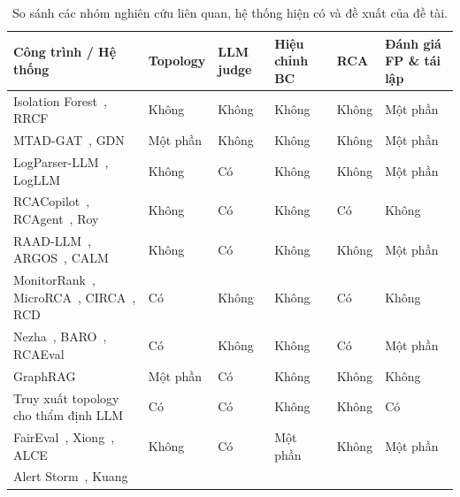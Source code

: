 \begin{table}[htbp]
  \centering
  \caption[So sánh công trình liên quan, hệ thống hiện có và đề xuất]{So sánh các nhóm nghiên cứu liên quan, hệ thống hiện có và đề xuất của đề tài.}
  \label{tab:ch3-so-sanh}
  \footnotesize
  \renewcommand{\arraystretch}{1.15}
  \setlength{\tabcolsep}{3.5pt}
  \begin{tabularx}{\linewidth}{@{}Y >{\centering\arraybackslash}p{1.45cm} >{\centering\arraybackslash}p{1.45cm} >{\centering\arraybackslash}p{1.6cm} >{\centering\arraybackslash}p{1.2cm} >{\centering\arraybackslash}p{1.65cm}@{}}
    \toprule
    \textbf{Công trình / Hệ thống} &
    \textbf{Topology} &
    \textbf{LLM judge} &
    \textbf{Hiệu chỉnh BC} &
    \textbf{RCA} &
    \textbf{Đánh giá FP \& tái lập} \\
    \midrule
    Isolation Forest~\cite{liu2008iforest}, RRCF~\cite{guha2016rrcf} &
      Không & Không & Không & Không & Một phần \\
    MTAD-GAT~\cite{zhao2020mtadgat}, GDN~\cite{deng2021gdn} &
      Một phần & Không & Không & Không & Một phần \\
    LogParser-LLM~\cite{zhong2024logparser}, LogLLM~\cite{guan2024logllm} &
      Không & Có & Không & Không & Một phần \\
    RCACopilot~\cite{chen2024rcacopilot}, RCAgent~\cite{wang2024rcagent}, Roy~\cite{roy2024exploring} &
      Không & Có & Không & Có & Không \\
    RAAD-LLM~\cite{russellgilbert2025raad}, ARGOS~\cite{gu2025argos}, CALM~\cite{devireddy2025calm} &
      Không & Có & Không & Không & Một phần \\
    MonitorRank~\cite{kim2013monitorrank}, MicroRCA~\cite{wu2020microrca}, CIRCA~\cite{li2022circa}, RCD~\cite{ikram2022rcd} &
      Có & Không & Không & Có & Không \\
    Nezha~\cite{yu2023nezha}, BARO~\cite{pham2024baro}, RCAEval~\cite{pham2025rcaeval} &
      Có & Không & Không & Có & Một phần \\
    GraphRAG~\cite{edge2024graphrag} &
      Một phần & Có & Không & Không & Không \\
    Truy xuất topology cho thẩm định LLM~\cite{author2026icaetm} &
      Có & Có & Không & Không & Có \\
    FairEval~\cite{wang2024fair}, Xiong~\cite{xiong2024uncertainty}, ALCE~\cite{gao2023alce} &
      Không & Có & Một phần & Không & Một phần \\
    Alert Storm~\cite{zhao2020alertstorm}, Kuang~\cite{kuang2024knowledge} &

\end{tabularx}
\end{table}
